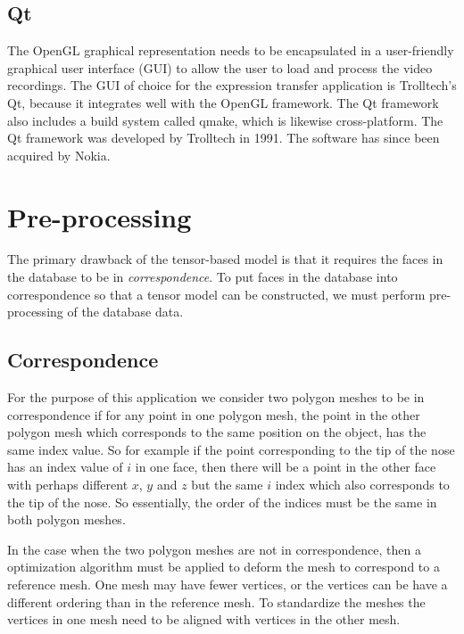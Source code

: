 \documentclass[11pt,a4paper]{report}
\begin{document}
\subsection{Qt}
The OpenGL graphical representation needs to be encapsulated in a user-friendly graphical user
interface (GUI) to allow the user to load and process the video recordings. The GUI
of choice for the expression transfer application is Trolltech's Qt, because it integrates well
with the OpenGL framework. The Qt framework also includes a build system called qmake, which is
likewise cross-platform. The Qt framework was developed by Trolltech in 1991. The
software has since been acquired by Nokia.  


\section{Pre-processing}
The primary drawback of the tensor-based model is that it requires the faces in
the database to be in \textit{correspondence}. To put faces in the database into correspondence
so that a tensor model can be constructed, we must perform pre-processing of the
database data.

\subsection{Correspondence}
For the purpose of this application we consider two polygon meshes to be in correspondence
if for any point in one polygon mesh, the point in the other polygon mesh which corresponds to the
same position on the object, has the same index value. So for example if the
point corresponding to the tip of the nose has an index value of $i$ in one
face, then  there will be a point in the other face with perhaps
different $x$, $y$ and $z$ but the same $i$ index which also corresponds to the
tip of the nose. So essentially, the order of the indices must be the same in both
polygon meshes. 

In the case when the two polygon meshes are not in correspondence, then a
optimization algorithm must be applied to deform the mesh to correspond to a
reference mesh. One mesh may have fewer vertices, or the vertices can be have a different
ordering than in the reference mesh. To standardize the meshes the vertices in
one mesh need to be aligned with vertices in the other mesh. 
\end{document}

